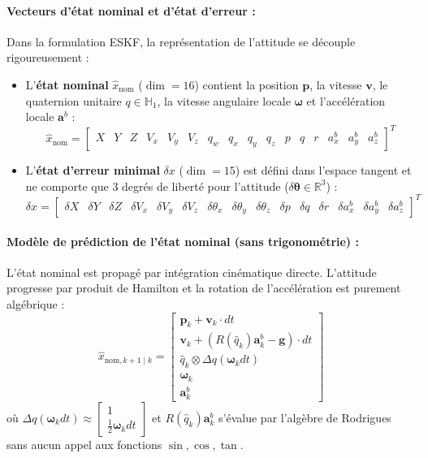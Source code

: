\documentclass[../Formulations_Kalman.tex]{subfiles}
\begin{document}
\paragraph{Vecteurs d'état nominal et d'état d'erreur :}
Dans la formulation ESKF, la représentation de l'attitude se découple rigoureusement :
\begin{itemize}
    \item L'\textbf{état nominal} $\hat{x}_{\text{nom}}$ ($\dim = 16$) contient la position $\mathbf{p}$, la vitesse $\mathbf{v}$, le quaternion unitaire $q \in \mathbb{H}_1$, la vitesse angulaire locale $\boldsymbol{\omega}$ et l'accélération locale $\mathbf{a}^b$ :
    \begin{equation}
    \hat{x}_{\text{nom}} = \begin{bmatrix} X & Y & Z & V_x & V_y & V_z & q_w & q_x & q_y & q_z & p & q & r & a_x^b & a_y^b & a_z^b \end{bmatrix}^T
    \end{equation}
    \item L'\textbf{état d'erreur minimal} $\delta x$ ($\dim = 15$) est défini dans l'espace tangent et ne comporte que 3 degrés de liberté pour l'attitude ($\delta\boldsymbol{\theta} \in \mathbb{R}^3$) :
    \begin{equation}
    \delta x = \begin{bmatrix} \delta X & \delta Y & \delta Z & \delta V_x & \delta V_y & \delta V_z & \delta\theta_x & \delta\theta_y & \delta\theta_z & \delta p & \delta q & \delta r & \delta a_x^b & \delta a_y^b & \delta a_z^b \end{bmatrix}^T
    \end{equation}
\end{itemize}

\paragraph{Modèle de prédiction de l'état nominal (sans trigonométrie) :}
L'état nominal est propagé par intégration cinématique directe. L'attitude progresse par produit de Hamilton et la rotation de l'accélération est purement algébrique :
\begin{equation}
\hat{x}_{\text{nom}, k+1\mid k} = \begin{bmatrix}
\mathbf{p}_k + \mathbf{v}_k \cdot dt \\
\mathbf{v}_k + \left( R(\hat{q}_k) \mathbf{a}_k^b - \mathbf{g} \right) \cdot dt \\
\hat{q}_k \otimes \Delta q(\boldsymbol{\omega}_k dt) \\
\boldsymbol{\omega}_k \\
\mathbf{a}_k^b
\end{bmatrix}
\end{equation}
où $\Delta q(\boldsymbol{\omega}_k dt) \approx \begin{bmatrix} 1 \\ \frac{1}{2} \boldsymbol{\omega}_k dt \end{bmatrix}$ et $R(\hat{q}_k) \mathbf{a}_k^b$ s'évalue par l'algèbre de Rodrigues sans aucun appel aux fonctions $\sin, \cos, \tan$.
\end{document}
